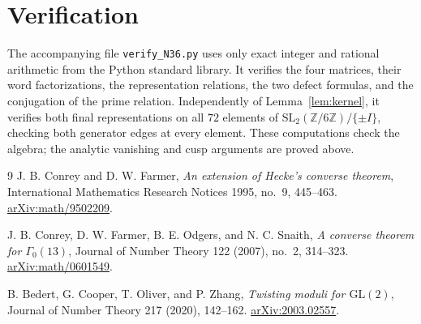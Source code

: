 \documentclass[11pt]{article}
\theoremstyle{remark}
\newcommand{\SL}{\mathrm{SL}}
\begin{document}
\section{Verification}

The accompanying file \texttt{verify\_N36.py} uses only exact integer and
rational arithmetic from the Python standard library.  It verifies the
four matrices, their word factorizations, the representation relations,
the two defect formulas, and the conjugation of the prime relation.
Independently of Lemma~\ref{lem:kernel}, it verifies both final
representations on all $72$ elements of
$\SL_2(\mathbb Z/6\mathbb Z)/\{\pm I\}$, checking both generator edges
at every element.  These computations check the algebra; the analytic
vanishing and cusp arguments are proved above.

\begin{thebibliography}{9}
J. B. Conrey and D. W. Farmer,
\emph{An extension of Hecke's converse theorem},
International Mathematics Research Notices 1995, no.~9, 445--463.
\href{https://arxiv.org/abs/math/9502209}{arXiv:math/9502209}.

J. B. Conrey, D. W. Farmer, B. E. Odgers, and N. C. Snaith,
\emph{A converse theorem for $\Gamma_0(13)$},
Journal of Number Theory 122 (2007), no.~2, 314--323.
\href{https://arxiv.org/abs/math/0601549}{arXiv:math/0601549}.

B. Bedert, G. Cooper, T. Oliver, and P. Zhang,
\emph{Twisting moduli for $\mathrm{GL}(2)$},
Journal of Number Theory 217 (2020), 142--162.
\href{https://arxiv.org/abs/2003.02557}{arXiv:2003.02557}.
\end{thebibliography}
\end{document}
